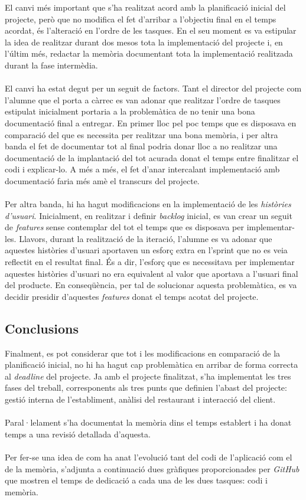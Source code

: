 El canvi més important que s'ha realitzat acord amb la planificació inicial del projecte, però que no modifica el fet d'arribar a l'objectiu final en el temps acordat, és l'alteració en l'ordre de les tasques. En el seu moment es va estipular la idea de realitzar durant dos mesos tota la implementació del projecte i, en l'últim més, redactar la memòria documentant tota la implementació realitzada durant la fase intermèdia.
\\\\
El canvi ha estat degut per un seguit de factors. Tant el director del projecte com l'alumne que el porta a càrrec es van adonar que realitzar l'ordre de tasques estipulat inicialment portaria a la problemàtica de no tenir una bona documentació final a entregar. En primer lloc pel poc temps que es disposava en comparació del que es necessita per realitzar una bona memòria, i per altra banda el fet de documentar tot al final podria donar lloc a no realitzar una documentació de la implantació del tot acurada donat el temps entre finalitzar el codi i explicar-lo. A més a més, el fet d'anar intercalant implementació amb documentació faria més amè el transcurs del projecte.
\\\\
Per altra banda, hi ha hagut modificacions en la implementació de les \textit{històries d'usuari}. Inicialment, en realitzar i definir \textit{backlog} inicial, es van crear un seguit de \textit{features} sense contemplar del tot el temps que es disposava per implementar-les. Llavors, durant la realització de la iteració, l'alumne es va adonar que aquestes històries d'usuari aportaven un esforç extra en l'sprint que no es veia reflectit en el resultat final. És a dir, l'esforç que es necessitava per implementar aquestes històries d'usuari no era equivalent al valor que aportava a l'usuari final del producte. En conseqüència, per tal de solucionar aquesta problemàtica, es va decidir presidir d'aquestes \textit{features} donat el temps acotat del projecte.

\subsection{Conclusions}

Finalment, es pot considerar que tot i les modificacions en comparació de la planificació inicial, no hi ha hagut cap problemàtica en arribar de forma correcta al \textit{deadline} del projecte. Ja amb el projecte finalitzat, s'ha implementat les tres fases del treball, corresponents als tres punts que definien l'abast del projecte: gestió interna de l'establiment, anàlisi del restaurant i interacció del client.
\\\\
Paral·lelament s'ha documentat la memòria dins el temps establert i ha donat temps a una revisió detallada d'aquesta.
\\\\
Per fer-se una idea de com ha anat l'evolució tant del codi de l'aplicació com el de la memòria, s'adjunta a continuació dues gràfiques proporcionades per \textit{GitHub} que mostren el temps de dedicació a cada una de les dues tasques: codi i memòria.

